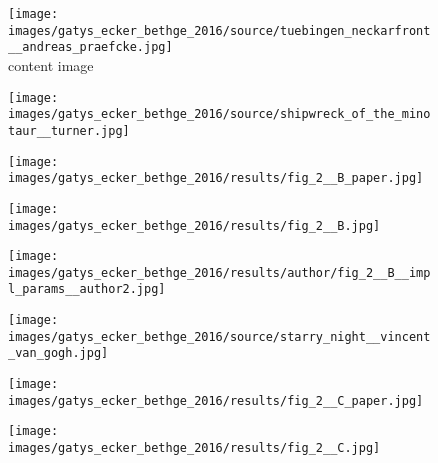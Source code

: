 \begin{figure}[H]
	\centering
	\begin{minipage}[t]{0.24\textwidth}
		\centering
		\texttt{[image: images/gatys\_ecker\_bethge\_2016/source/tuebingen\_neckarfront\_\_andreas\_praefcke.jpg]}\\
		content image
	\end{minipage}
	\hfill%
	\begin{minipage}[t]{0.24\textwidth}
		\centering
		\hfill
	\end{minipage}
	\hfill%
	\begin{minipage}[t]{0.24\textwidth}
		\centering
		\hfill
	\end{minipage}
	\hfill%
	\begin{minipage}[t]{0.24\textwidth}
		\centering
		\hfill
	\end{minipage}
	\hfill%
	\begin{minipage}[t]{0.24\textwidth}
		\centering
		\texttt{[image: images/gatys\_ecker\_bethge\_2016/source/shipwreck\_of\_the\_minotaur\_\_turner.jpg]}
	\end{minipage}
	\hfill%
	\begin{minipage}[t]{0.24\textwidth}
		\centering
		\texttt{[image: images/gatys\_ecker\_bethge\_2016/results/fig\_2\_\_B\_paper.jpg]}
	\end{minipage}
	\hfill%
	\begin{minipage}[t]{0.24\textwidth}
		\centering
		\texttt{[image: images/gatys\_ecker\_bethge\_2016/results/fig\_2\_\_B.jpg]}
	\end{minipage}
	\hfill%
	\begin{minipage}[t]{0.24\textwidth}
		\centering
		\texttt{[image: images/gatys\_ecker\_bethge\_2016/results/author/fig\_2\_\_B\_\_impl\_params\_\_author2.jpg]}
	\end{minipage}
	\hfill%
	\begin{minipage}[t]{0.24\textwidth}
		\centering
		\texttt{[image: images/gatys\_ecker\_bethge\_2016/source/starry\_night\_\_vincent\_van\_gogh.jpg]}
	\end{minipage}
	\hfill%
	\begin{minipage}[t]{0.24\textwidth}
		\centering
		\texttt{[image: images/gatys\_ecker\_bethge\_2016/results/fig\_2\_\_C\_paper.jpg]}
	\end{minipage}
	\hfill%
	\begin{minipage}[t]{0.24\textwidth}
		\centering
		\texttt{[image: images/gatys\_ecker\_bethge\_2016/results/fig\_2\_\_C.jpg]}

\end{minipage}
\end{figure}
